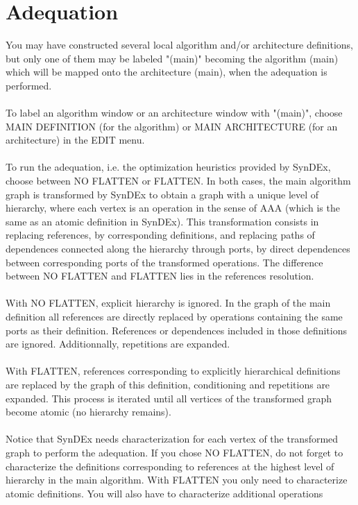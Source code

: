 \documentclass[11pt,twoside]{report}
\begin{document}
\chapter{Adequation}
You may have constructed several local algorithm and/or architecture
definitions, but only one of them may be labeled "(main)" becoming the
algorithm (main) which will be mapped onto the architecture (main),
when the adequation is performed.\\\\
To label an algorithm window or an architecture window with "(main)",
choose MAIN DEFINITION (for the algorithm) or MAIN ARCHITECTURE (for
an architecture) in the EDIT menu.\\\\
To run the adequation, i.e. the optimization heuristics provided by
SynDEx, choose between NO FLATTEN or FLATTEN. In both cases, the main
algorithm graph is transformed by SynDEx to obtain a graph with a
unique level of hierarchy, where each vertex is an operation in the
sense of AAA (which is the same as an atomic definition in SynDEx).
This transformation consists in replacing references, by corresponding
definitions, and replacing paths of dependences connected along the
hierarchy through ports, by direct dependences between corresponding
ports of the transformed operations. The difference between NO FLATTEN
and FLATTEN lies in the references resolution.\\\\
With NO FLATTEN, explicit hierarchy is ignored. In the graph of the
main definition all references are directly replaced by operations
containing the same ports as their definition. References or
dependences included in those definitions are ignored. Additionnally,
repetitions are expanded.\\\\
With FLATTEN, references corresponding to explicitly hierarchical
definitions are replaced by the graph of this definition, conditioning
and repetitions are expanded. This process is iterated until all
vertices of the transformed graph become
atomic (no hierarchy remains).\\\\
Notice that SynDEx needs characterization for each vertex of the
transformed graph to perform the adequation. If you chose NO FLATTEN,
do not forget to characterize the definitions corresponding to
references at the highest level of hierarchy in the main algorithm.
With FLATTEN you only need to characterize atomic definitions. You
will also have to characterize additional operations
\end{document}
